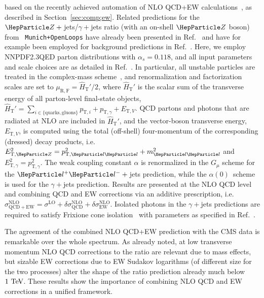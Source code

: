 \documentclass[11pt]{cernrep}
\begin{document}
based on the recently achieved automation of NLO QCD+EW
calculations~\cite{Kallweit:2014xda,Kallweit:2015dum}, as described in
Section~\ref{sec:comp;ew}. Related predictions for the
$\PZ+{}$jets/$\gamma+{}$jets ratio (with an on-shell $\PZ$ boson) from {\tt
  Munich+OpenLoops} have already been presented
in Ref.~\cite{Kallweit:2015fta} and have for example been employed for
background predictions in Ref.~\cite{CMS:2015jdt}. Here, we employ
NNPDF2.3QED \cite{Ball:2013hta} parton distributions with
$\alpha_s=0.118$, and all input parameters and scale choices are as
detailed in Ref.~\cite{Kallweit:2015dum}. In particular, all unstable
particles are treated in the complex-mass scheme~\cite{Denner:2005fg},
and renormalization and factorization scales are set to
$\mu_{\mathrm{R,F}}=\hat{H}_{\mathrm{T}}'/2$, where $\hat{H}_{\mathrm{T}}'$ is
the scalar sum of the transverse energy of all parton-level
final-state objects, $\hat{H}_{\mathrm{T}}' = \sum_{i\in
  \{\mathrm{quarks,gluons}\}} p_{\mathrm{T},i} + p_{\mathrm{T},\gamma}
+ E_{\mathrm{T}, V}$. QCD partons and photons that are radiated at NLO
are included in $\hat{H}_{\mathrm{T}}'$, and the vector-boson
transverse energy, $E_{\mathrm{T},V}$, is computed using the total
(off-shell) four-momentum of the corresponding (dressed) decay
products, i.e.\
$E^2_{\mathrm{T},\PZ}=p^2_{\mathrm{T},\Pl\Pl}+m_{\Pl\Pl}^2$ and
$E^2_{\mathrm{T},\gamma}=p_{\mathrm{T},\gamma}^2$. The weak coupling
constant $\alpha$ is renormalized in the $G_{\mu}$ scheme for the
$\Pl^+\Pl^-+{}$jets prediction, while the $\alpha(0)$~scheme is used
for the $\gamma+{}$jets prediction. Results are presented at the NLO QCD
level and combining QCD and EW corrections via an additive
prescription, i.e.\ $\sigma^{\mathrm{NLO}}_{\mathrm{QCD+EW}} =
\sigma^{\mathrm{LO}}+\delta\sigma^{\mathrm{NLO}}_{\mathrm{QCD}} +
\delta\sigma^{\mathrm{NLO}}_{\mathrm{EW}}$. Isolated photons in the
$\gamma+{}$jets predictions are required to satisfy Frixione cone
isolation~\cite{Frixione} with parameters as specified in
Ref.~\cite{Khachatryan:2015ira}.

The agreement of the combined NLO QCD+EW prediction with the CMS data is
remarkable over the whole spectrum. As already noted, at low transverse momentum
NLO QCD corrections to the ratio are relevant due to mass effects, but sizable
EW corrections due to EW Sudakov logarithms (of different size for the two
processes) alter the shape of the ratio prediction already much below $1~\text{TeV}$.
These results show the importance of combining NLO QCD and EW corrections in a
unified framework.
\end{document}
